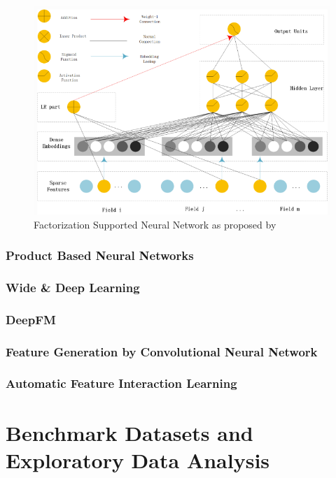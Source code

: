 \documentclass{mldsmsc}
\begin{document}
\begin{figure}[h]
\centering
\includegraphics[]{../figures/fnn.png}
\caption{Factorization Supported Neural Network as proposed by \cite{RefWorks:zhang2016deep}}
\label{fig:fnn}
\end{figure}

\subsubsection{Product Based Neural Networks}

\subsubsection{Wide \& Deep Learning}

\subsubsection{DeepFM}

\subsubsection{Feature Generation by Convolutional Neural Network}

\subsubsection{Automatic Feature Interaction Learning}

\section{Benchmark Datasets and Exploratory Data Analysis}
\end{document}
